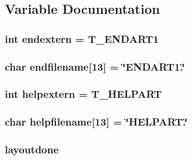 \subsection{Variable Documentation}
\hypertarget{WL__TEXT_8C_a9414485b9ffb5157a3d3469d1588fd2a}{
\subsubsection[{endextern}]{\setlength{\rightskip}{0pt plus 5cm}int {\bf endextern} = T\_\-ENDART1}}
\label{WL__TEXT_8C_a9414485b9ffb5157a3d3469d1588fd2a}
\hypertarget{WL__TEXT_8C_ab0714dbebe80dcbdefd80f2f20800171}{
\subsubsection[{endfilename}]{\setlength{\rightskip}{0pt plus 5cm}char {\bf endfilename}\mbox{[}13\mbox{]} = \char`\"{}ENDART1.\char`\"{}}}
\label{WL__TEXT_8C_ab0714dbebe80dcbdefd80f2f20800171}
\hypertarget{WL__TEXT_8C_a910c7d3090fe5a0e86c16a2baddcb1c8}{
\subsubsection[{helpextern}]{\setlength{\rightskip}{0pt plus 5cm}int {\bf helpextern} = T\_\-HELPART}}
\label{WL__TEXT_8C_a910c7d3090fe5a0e86c16a2baddcb1c8}
\hypertarget{WL__TEXT_8C_a305be2d1fe1747006daab18fa395fdae}{
\subsubsection[{helpfilename}]{\setlength{\rightskip}{0pt plus 5cm}char {\bf helpfilename}\mbox{[}13\mbox{]} = \char`\"{}HELPART.\char`\"{}}}
\label{WL__TEXT_8C_a305be2d1fe1747006daab18fa395fdae}
\hypertarget{WL__TEXT_8C_a0755a01e7d94b21d0d57168ac818089e}{
\subsubsection[{layoutdone}]{ {\bf layoutdone}}}
